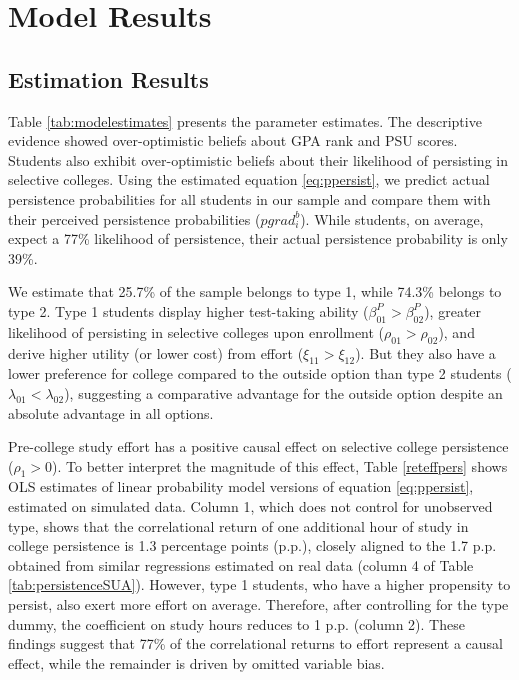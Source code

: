  \section{Model Results}\label{sec:model_results}

\subsection{Estimation Results}\label{sec:estim_results}

Table \ref{tab:modelestimates} presents the parameter estimates. The descriptive evidence showed over-optimistic beliefs about GPA rank and PSU scores. Students also exhibit over-optimistic beliefs about their likelihood of persisting in selective colleges. Using the estimated equation \eqref{eq:ppersist}, we predict actual persistence probabilities for all students in our sample and compare them with their perceived persistence probabilities ($pgrad^b_i$). While students, on average, expect a 77\% likelihood of persistence, their actual persistence probability is only 39\%.  \par


We estimate that 25.7\% of the sample belongs to type 1, while 74.3\% belongs to type 2. Type 1 students display higher test-taking ability ($\beta^P_{01}>\beta^P_{02}$), greater likelihood of persisting in selective colleges upon enrollment ($\rho_{01}>\rho_{02}$), and derive higher utility (or lower cost) from effort ($\xi_{11}>\xi_{12}$). But they also have a lower preference for college compared to the outside option than type 2 students ($\lambda_{01}<\lambda_{02}$), suggesting a comparative advantage for the outside option despite an absolute advantage in all options.\par 





Pre-college study effort has a positive causal effect on selective college persistence ($\rho_1>0$). To better interpret the magnitude of this effect, Table \ref{reteffpers} shows OLS estimates of linear probability model versions of equation \eqref{eq:ppersist}, estimated on simulated data. Column 1, which does not control for unobserved type, shows that the correlational return of one additional hour of study in college persistence is 1.3 percentage points (p.p.), closely aligned to the 1.7 p.p. obtained from similar regressions estimated on real data (column 4 of Table \ref{tab:persistenceSUA}). However, type 1 students, who have a higher propensity to persist, also exert more effort on average. Therefore, after controlling for the type dummy, the coefficient on study hours reduces to 1 p.p. (column 2). These findings suggest that 77\% of the correlational returns to effort represent a causal effect, while the remainder is driven by omitted variable bias.\par 




